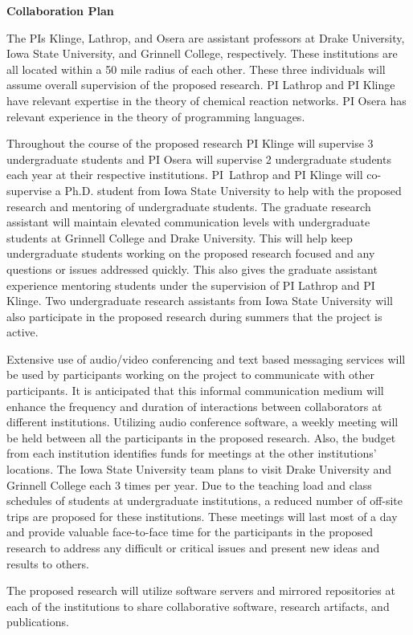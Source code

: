 \documentclass[11pt]{article}
\begin{document}
    \setcounter{page}{1}
    \begin{center}
        {\Large {\bf Collaboration Plan}}
    \end{center}

      The PIs Klinge, Lathrop, and Osera are assistant professors at Drake University, Iowa State University, and Grinnell College, respectively.
      These institutions are all located within a 50 mile radius of each other.
      These three individuals will assume overall supervision of the proposed research.
      PI Lathrop and PI Klinge have relevant expertise in the theory of chemical reaction networks.
      PI Osera has relevant experience in the theory of programming languages.
    
      Throughout the course of the proposed research PI Klinge will supervise 3 undergraduate students and PI Osera will supervise 2 undergraduate students each year at their respective institutions.
      PI~Lathrop and PI Klinge will co-supervise a Ph.D. student from Iowa State University to help with the proposed research and mentoring of undergraduate students.
      The graduate research assistant will maintain elevated communication levels with undergraduate students at Grinnell College and Drake University.
      This will help keep undergraduate students working on the proposed research focused and any questions or issues addressed quickly.
      This also gives the graduate assistant experience mentoring students under the supervision of PI Lathrop and PI Klinge.
      Two undergraduate research assistants from Iowa State University will also participate in the proposed research during summers that the project is active.
    
      Extensive use of audio/video conferencing and text based messaging services will be used by participants working on the project to communicate with other participants.
      It is anticipated that this informal communication medium will enhance the frequency and duration of interactions between collaborators at different institutions.
      Utilizing audio conference software, a weekly meeting will be held between all the participants in the proposed research.
      Also, the budget from each institution identifies funds for meetings at the other institutions' locations.
      The Iowa State University team plans to visit Drake University and Grinnell College each 3 times per year.
      Due to the teaching load and class schedules of students at undergraduate institutions, a reduced number of off-site trips are proposed for these institutions.
      These meetings will last most of a day and provide valuable face-to-face time for the participants in the proposed research to address any difficult or critical issues and present new ideas and results to others.
    
      The proposed research will utilize software servers and mirrored repositories at each of the institutions to share collaborative software, research artifacts, and publications.
    
\end{document}
